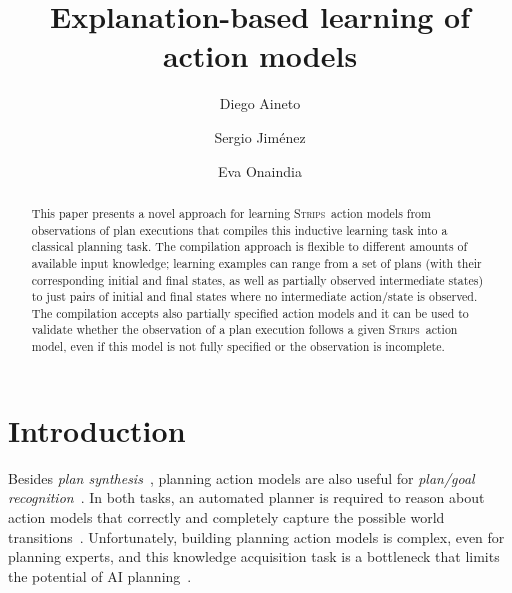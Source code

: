 \documentclass[runningheads]{llncs}
\newcommand{\strips}{\textsc{Strips}}     %
\begin{document}
%
\title{Explanation-based learning of action models}
%
%
\author{Diego Aineto\orcidID{} \and
Sergio Jim\'enez \and
Eva Onaindia}
%
%
%
\maketitle              %
%
\begin{abstract}
This paper presents a novel approach for learning \strips\ action models from observations of plan executions that compiles this inductive learning task into a classical planning task. The compilation approach is flexible to different amounts of available input knowledge; learning examples can range from a set of plans (with their corresponding initial and final states, as well as partially observed intermediate states) to just pairs of initial and final states where no intermediate action/state is observed. The compilation accepts also partially specified action models and it can be used to validate whether the observation of a plan execution follows a given \strips\ action model, even if this model is not fully specified or the observation is incomplete.
\end{abstract}



\section{Introduction}
Besides {\em plan synthesis}~\cite{ghallab2004automated}, planning action models are also useful for {\em plan/goal recognition}~\cite{ramirez2012plan}. In both tasks, an automated planner is required to reason about action models that correctly and completely capture the possible world transitions~\cite{geffner:book:2013}. Unfortunately, building planning action models is complex, even for planning experts, and this knowledge acquisition task is a bottleneck that limits the potential of AI planning~\cite{kambhampati:modellite:AAAI2007}.
\end{document}
